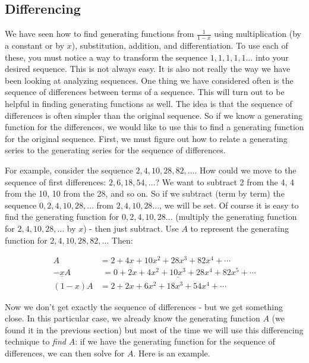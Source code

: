 \documentclass[12pt]{article}
\begin{document}
\subsection{Differencing}
We have seen how to find generating functions from $\frac{1}{1-x}$ using multiplication (by a constant or by $x$), substitution, addition, and differentiation.  To use each of these, you must notice a way to transform the sequence $1,1,1,1,1\ldots$ into your desired sequence.  This is not always easy.  It is also not really the way we have been looking at analyzing sequences.  One thing we have considered often is the sequence of differences between terms of a sequence.  This will turn out to be helpful in finding generating functions as well.  The idea is that the sequence of differences is often simpler than the original sequence.  So if we know a generating function for the differences, we would like to use this to find a generating function for the original sequence.  First, we must figure out how to relate a generating series to the generating series for the sequence of differences.
  
For example, consider the sequence $2, 4, 10, 28, 82, \ldots$.  How could we move to the sequence of first differences: $2, 6, 18, 54,\ldots$?  We want to subtract 2 from the 4, 4 from the 10, 10 from the 28, and so on.  So if we subtract (term by term) the sequence $0, 2, 4, 10, 28,\ldots$ from $2, 4, 10, 28\ldots$, we will be set.  Of course it is easy to find the generating function for $0,2,4,10,28\ldots$ (multiply the generating function for $2,4,10, 28, \ldots$ by $x$) - then just subtract.  Use $A$ to represent the generating function for $2, 4, 10, 28, 82, \ldots $  Then:

\begin{align*}
 A & = 2 + 4x + 10x^2 +28x^3 + 82x^4 + \cdots \\
 \underline{-xA} & \underline{\,\,= 0 + 2x + 4x^2 + 10x^3 + 28 x^4 + 82x^5 + \cdots} \\
 (1-x)A & = 2 + 2x + 6x^2 + 18x^3 + 54x^4 + \cdots
\end{align*}

Now we don't get exactly the sequence of differences - but we get something close.  In this particular case, we already know the generating function $A$ (we found it in the previous section) but most of the time we will use this differencing technique to {\em find} $A$: if we have the generating function for the sequence of differences, we can then solve for $A$.  Here is an example.
\end{document}
